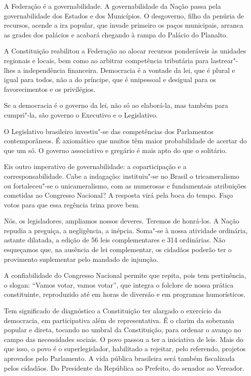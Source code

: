 A Federação é a governabilidade. A governabilidade da Nação passa pela
governabilidade dos Estados e dos Municípios. O desgoverno, filho da
penúria de recursos, acende a ira popular, que invade primeiro os paços
municipais, arranca as grades dos palácios e acabará chegando à rampa do
Palácio do Planalto.

A Constituição reabilitou a Federação ao alocar recursos ponderáveis às
unidades regionais e locais, bem como ao arbitrar competência tributária
para lastrear"-lhes a independência financeira. Democracia é a vontade da
lei, que é plural e igual para todos, não a do príncipe, que é
unipessoal e desigual para os favorecimentos e os privilégios.

Se a democracia é o governo da lei, não só ao elaborá-la, mas também
para cumpri"-la, são governo o Executivo e o Legislativo.

O Legislativo brasileiro investiu"-se das competências dos Parlamentos
contemporâneos. É axiomático que muitos têm maior probabilidade de
acertar do que um só. O governo associativo e gregário é mais apto do
que o solitário.

Eis outro imperativo de governabilidade: a coparticipação e a
corresponsabilidade. Cabe a indagação: instituiu"-se no Brasil o
tricameralismo ou fortaleceu"-se o unicameralismo, com as numerosas e
fundamentais atribuições cometidas ao Congresso Nacional? A resposta
virá pela boca do tempo. Faço votos para que essa regência trina prove
bem.

Nós, os legisladores, ampliamos nossos deveres. Teremos de honrá-los. A
Nação repudia a preguiça, a negligência, a inépcia. Soma"-se à nossa
atividade ordinária, astante dilatada, a edição de 56 leis
complementares e 314 ordinárias. Não esqueçamos que, na ausência de lei
complementar, os cidadãos poderão ter o provimento suplementar pelo
mandado de injunção.

A confiabilidade do Congresso Nacional permite que repita, pois tem
pertinência, o slogan: ``Vamos votar, vamos votar'', que integra o
folclore de nossa prática constituinte, reproduzido até em horas de
diversão e em programas humorísticos.

Tem significado de diagnóstico a Constituição ter alargado o exercício
da democracia, em participativa além de representativa. É o clarim da
soberania popular e direta, tocando no umbral da Constituição, para
ordenar o avanço no campo das necessidades sociais. O povo passou a ter
a iniciativa de leis. Mais do que isso, o povo é o superlegislador,
habilitado a rejeitar, pelo referendo, projetos aprovados pelo
Parlamento. A vida pública brasileira será também fiscalizada pelos
cidadãos. Do Presidente da República ao Prefeito, do senador ao
Vereador.


